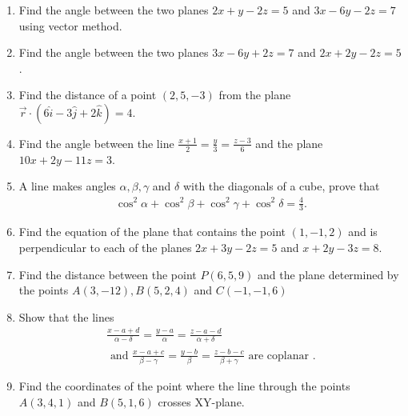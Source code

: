 \documentclass{article}
\theoremstyle{remark}
\begin{document}
\begin{enumerate}
\item Find the angle between the two planes $2x +y -2z =5$ and $3x- 6y- 2z= 7$ using vector method.
\item Find the angle between the two planes $3x -6y +2z =7$ and $2x +2y -2z =5$.
\item Find the distance of a point $(2, 5, -3)$ from the plane $\overrightarrow{r} \cdot (6\hat{i} -3\hat{j} +2\hat{k}) =4$.
\item Find the angle between the line $\frac{x+1}{2} =\frac{y}{3} =\frac{z-3}{6}$ and the plane $10x +2y -11z =3$.
\item A line makes angles $\alpha, \beta, \gamma$ and $\delta$  with the diagonals of a cube, prove that 
\begin{align}
\cos^2\alpha +\cos^2\beta +\cos^2\gamma +\cos^2\delta = \frac{4}{3}.
\end{align}
\item Find the equation of the plane that contains the point $(1, -1, 2)$ and is perpendicular to each of the planes $2x +3y -2z =5$ and $x +2y -3z =8$.
\item Find the distance between the point $P(6, 5, 9)$ and the plane determined by the points $A(3, -1 2), B( 5, 2,4)$ and $C(-1, -1, 6)$
\item Show that the lines 
\begin{align}
\frac{x-a+d}{\alpha -\delta} =\frac{y-a}{\alpha} =\frac{z-a-d}{\alpha +\delta}\\
 \text{  and } \frac{x-a+c}{\beta -\gamma} =\frac{y -b}{\beta} =\frac{z-b-c}{\beta +\gamma} \text{ are coplanar }.
\end{align}
\item Find the coordinates of the point where the line through the points $A(3,4,1)$ and $B(5, 1, 6)$ crosses XY-plane.
\end{enumerate}
\end{document}
